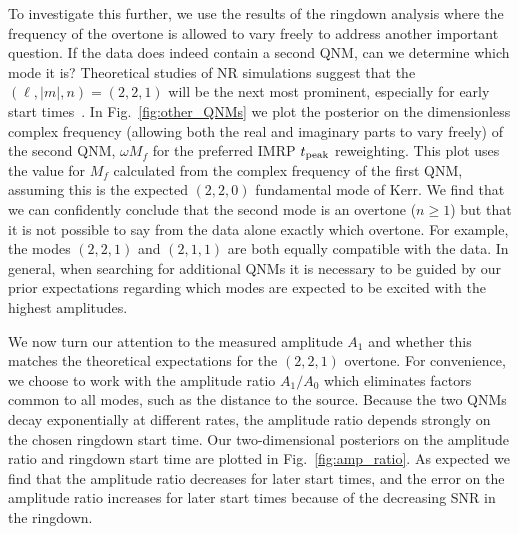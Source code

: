 To investigate this further, we use the results of the ringdown analysis where the frequency of the overtone is allowed to vary freely to address another important question. 
If the data does indeed contain a second QNM, can we determine which mode it is?
Theoretical studies of NR simulations suggest that the $(\ell,|m|,n)=(2,2,1)$ will be the next most prominent, especially for early start times~\cite{Giesler:2019uxc}. 
In Fig.~\ref{fig:other_QNMs} we plot the posterior on the dimensionless complex frequency (allowing both the real and imaginary parts to vary freely) of the second QNM, $\omega M_f$ for the preferred IMRP $t_{\rm peak}$ reweighting.
This plot uses the value for $M_f$ calculated from the complex frequency of the first QNM, assuming this is the expected $(2,2,0)$ fundamental mode of Kerr.
We find that we can confidently conclude that the second mode is an overtone ($n\geq 1$) but that it is not possible to say from the data alone exactly which overtone. 
For example, the modes $(2,2,1)$ and $(2,1,1)$ are both equally compatible with the data. 
In general, when searching for additional QNMs it is necessary to be guided by our prior expectations regarding which modes are expected to be excited with the highest amplitudes.

We now turn our attention to the measured amplitude $A_1$ and whether this matches the theoretical expectations for the $(2,2,1)$ overtone. 
For convenience, we choose to work with the amplitude ratio $A_1/A_0$ which eliminates factors common to all modes, such as the distance to the source. 
Because the two QNMs decay exponentially at different rates, the amplitude ratio depends strongly on the chosen ringdown start time.
Our two-dimensional posteriors on the amplitude ratio and ringdown start time are plotted in Fig.~\ref{fig:amp_ratio}.
As expected we find that the amplitude ratio decreases for later start times, and the error on the amplitude ratio increases for later start times because of the decreasing SNR in the ringdown.

